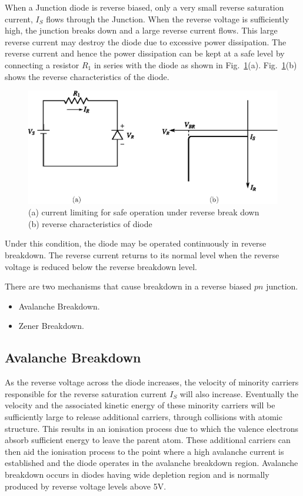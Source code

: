 When a Junction diode is reverse biased, only a very small reverse saturation current, $I_{S}$ flows through the Junction. When the reverse voltage is sufficiently high, the junction breaks down and a large reverse current flows. This large reverse current may destroy the diode due to excessive power dissipation. The reverse current and hence the power dissipation can be kept at a safe level by connecting a resistor $R_{1}$ in series with the diode as shown in Fig.~\ref{fig1.25}(a). Fig.~\ref{fig1.25}(b) shows the reverse characteristics of the diode.
\begin{figure}[H]
\centering
\includegraphics{chap1/fig1.25.eps}
\caption{(a) current limiting for safe operation under reverse break down\\\qquad\quad (b) reverse characteristics of diode}\label{fig1.25}
\end{figure}

Under this condition, the diode may be operated continuously in reverse breakdown. The reverse current returns to its normal level when the reverse voltage is reduced below the reverse breakdown level.

There are two mechanisms that cause breakdown in a reverse biased $pn$ junction.
\begin{itemize}
\item Avalanche Breakdown.

\item Zener Breakdown.
\end{itemize}


\subsection{Avalanche Breakdown}\label{sec1.22.1}

As the reverse voltage across the diode increases, the velocity of minority carriers responsible for the reverse saturation current $I_{S}$ will also increase. Eventually the velocity and the associated kinetic energy of these minority carriers will be sufficiently large to release additional carriers, through collisions with atomic structure. This results in an ionisation process due to which the valence electrons absorb sufficient energy to leave the parent atom. These additional carriers can then aid the ionisation process to the point where a high avalanche current is established and the diode operates in the avalanche breakdown region. Avalanche breakdown occurs in diodes having wide depletion region and is normally produced by reverse voltage levels above 5V.\\[-22pt]

